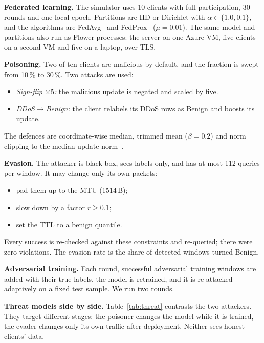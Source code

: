 \documentclass[conference]{IEEEtran}
\begin{document}
\textbf{Federated learning.} The simulator uses 10 clients with full participation, 30 rounds and one local epoch. Partitions are IID or Dirichlet with $\alpha\in\{1.0, 0.1\}$, and the algorithms are FedAvg~\cite{mcmahan2017fedavg} and FedProx~\cite{li2020fedprox} ($\mu=0.01$). The same model and partitions also run as Flower processes: the server on one Azure VM, five clients on a second VM and five on a laptop, over TLS.

\textbf{Poisoning.} Two of ten clients are malicious by default, and the fraction is swept from 10\,\% to 30\,\%. Two attacks are used:
\begin{itemize}
\item \emph{Sign-flip $\times5$:} the malicious update is negated and scaled by five.
\item \emph{DDoS$\rightarrow$Benign:} the client relabels its DDoS rows as Benign and boosts its update.
\end{itemize}
The defences are coordinate-wise median, trimmed mean ($\beta=0.2$) and norm clipping to the median update norm~\cite{yin2018byzantine}.

\textbf{Evasion.} The attacker is black-box, sees labels only, and has at most 112 queries per window. It may change only its own packets:
\begin{itemize}
\item pad them up to the MTU (1514\,B);
\item slow down by a factor $r\ge0.1$;
\item set the TTL to a benign quantile.
\end{itemize}
Every success is re-checked against these constraints and re-queried; there were zero violations. The evasion rate is the share of detected windows turned Benign.

\textbf{Adversarial training.} Each round, successful adversarial training windows are added with their true labels, the model is retrained, and it is re-attacked adaptively on a fixed test sample. We run two rounds.

\textbf{Threat models side by side.} Table~\ref{tab:threat} contrasts the two attackers. They target different stages: the poisoner changes the model while it is trained, the evader changes only its own traffic after deployment. Neither sees honest clients' data.
\end{document}

